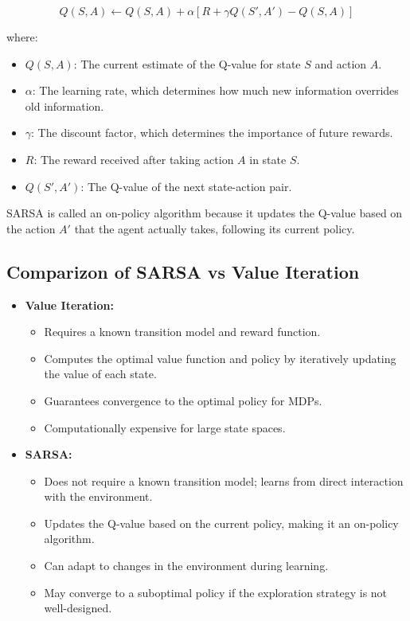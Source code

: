 \documentclass{article}
\begin{document}
\[
Q(S, A) \leftarrow Q(S, A) + \alpha \left[ R + \gamma Q(S', A') - Q(S, A) \right]
\]

where:
\begin{itemize}
    \item \(Q(S, A)\): The current estimate of the Q-value for state \(S\) and action \(A\).
    \item \(\alpha\): The learning rate, which determines how much new information overrides old information.
    \item \(\gamma\): The discount factor, which determines the importance of future rewards.
    \item \(R\): The reward received after taking action \(A\) in state \(S\).
    \item \(Q(S', A')\): The Q-value of the next state-action pair.
\end{itemize}

SARSA is called an on-policy algorithm because it updates the Q-value based on the action \(A'\) that the agent actually takes, following its current policy.

\subsection*{Comparizon of SARSA vs Value Iteration}
\begin{itemize}
    \item \textbf{Value Iteration:}
    \begin{itemize}
        \item Requires a known transition model and reward function.
        \item Computes the optimal value function and policy by iteratively updating the value of each state.
        \item Guarantees convergence to the optimal policy for MDPs.
        \item Computationally expensive for large state spaces.
    \end{itemize}
    \item \textbf{SARSA:}
    \begin{itemize}
        \item Does not require a known transition model; learns from direct interaction with the environment.
        \item Updates the Q-value based on the current policy, making it an on-policy algorithm.
        \item Can adapt to changes in the environment during learning.
        \item May converge to a suboptimal policy if the exploration strategy is not well-designed.
    \end{itemize}
\end{itemize}
\end{document}
